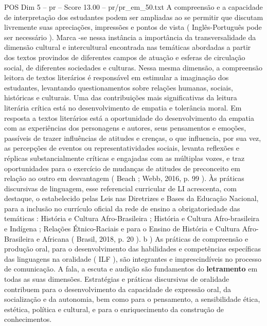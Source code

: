 \begin{textsample}{POS Dim 5 – pr – Score 13.00 – pr/pr\_em\_50.txt}
A compreensão e a capacidade de interpretação dos estudantes podem ser ampliadas ao se permitir que discutam livremente suas apreciações, impressões e pontos de vista ( Inglês-Português pode ser necessário ).
Marca -se nessa instância a importância da transversalidade da dimensão cultural e intercultural encontrada nas temáticas abordadas a partir dos textos provindos de diferentes campos de atuação e esferas de circulação social, de diferentes sociedades e culturas.
Nessa mesma dimensão, a compreensão leitora de textos literários é responsável em estimular a imaginação dos estudantes, levantando questionamentos sobre relações humanas, sociais, históricas e culturais.
Uma das contribuições mais significativas da leitura literária crítica está no desenvolvimento de empatia e tolerância moral.
Em resposta a textos literários está a oportunidade do desenvolvimento da empatia com as experiências dos personagens e autores, seus pensamentos e emoções, passíveis de trazer influências de atitudes e crenças, o que influencia, por sua vez, as percepções de eventos ou representatividades sociais, levanta reflexões e réplicas substancialmente críticas e engajadas com as múltiplas vozes, e traz oportunidades para o exercício de mudanças de atitudes de preconceito em relação ao outro em desvantagem ( Beach ; Webb, 2016, p. 99 ).
Às práticas discursivas de linguagem, esse referencial curricular de LI acrescenta, com destaque, o estabelecido pelas Leis nas Diretrizes e Bases da Educação Nacional, para a inclusão no currículo oficial da rede de ensino a obrigatoriedade das temáticas : História e Cultura Afro-Brasileira ; História e Cultura Afro-brasileira e Indígena ; Relações Étnico-Raciais e para o Ensino de História e Cultura Afro-Brasileira e Africana ( Brasil, 2018, p. 20 ). b ) As práticas de compreensão e produção oral, para o desenvolvimento das habilidades e competências específicas das linguagens na oralidade ( ILF ), são integrantes e imprescindíveis no processo de comunicação.
A fala, a escuta e audição são fundamentos do \textbf{letramento} em todas as suas dimensões.
Estratégias e práticas discursivas de oralidade contribuem para o desenvolvimento da capacidade de expressão oral, da socialização e da autonomia, bem como para o pensamento, a sensibilidade ética, estética, política e cultural, e para o enriquecimento da construção de conhecimentos.

\end{textsample}
